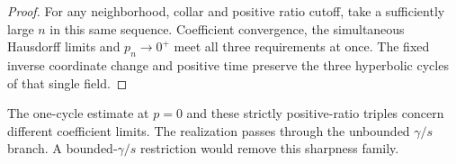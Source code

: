 \begin{proof}
For any neighborhood, collar and positive ratio cutoff, take a
sufficiently large $n$ in this same sequence. Coefficient convergence,
the simultaneous Hausdorff limits and $p_n\to0^+$ meet all three
requirements at once. The fixed inverse coordinate change and positive
time preserve the three hyperbolic cycles of that single field.
\end{proof}

The one-cycle estimate at $p=0$ and these strictly positive-ratio
triples concern different coefficient limits. The realization passes
through the unbounded $\gamma/s$ branch. A bounded-$\gamma/s$
restriction would remove this sharpness family.
